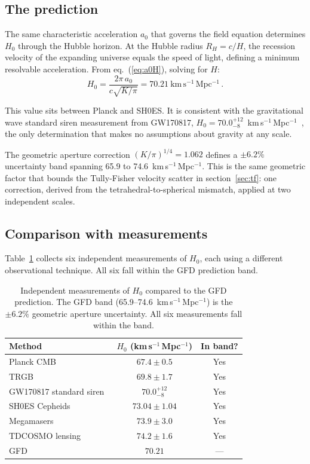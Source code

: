 \documentclass[a4paper,11pt]{article}
\begin{document}
\subsection{The prediction}

The same characteristic acceleration $a_0$ that governs the field equation determines $H_0$ through the Hubble horizon. At the Hubble radius $R_H = c/H$, the recession velocity of the expanding universe equals the speed of light, defining a minimum resolvable acceleration. From eq.~(\ref{eq:a0H}), solving for $H$:
\begin{equation}
H_0 = \frac{2\pi\,a_0}{c\sqrt{K/\pi}} = 70.21~\mathrm{km\,s^{-1}\,Mpc^{-1}}\,.
\label{eq:H0}
\end{equation}

This value sits between Planck and SH0ES. It is consistent with the gravitational wave standard siren measurement from GW170817, $H_0 = 70.0^{+12}_{-8}$~km\,s$^{-1}$\,Mpc$^{-1}$~\cite{abbott2017gw}, the only determination that makes no assumptions about gravity at any scale.

The geometric aperture correction $(K/\pi)^{1/4} = 1.062$ defines a $\pm 6.2\%$ uncertainty band spanning 65.9 to 74.6~km\,s$^{-1}$\,Mpc$^{-1}$. This is the same geometric factor that bounds the Tully-Fisher velocity scatter in section~\ref{sec:tf}: one correction, derived from the tetrahedral-to-spherical mismatch, applied at two independent scales.

\subsection{Comparison with measurements}

Table~\ref{tab:h0} collects six independent measurements of $H_0$, each using a different observational technique. All six fall within the GFD prediction band.

\begin{table}[t]
\centering
\begin{tabular}{@{}lcc@{}}
\toprule
Method & $H_0$ (km\,s$^{-1}$\,Mpc$^{-1}$) & In band? \\
\midrule
Planck CMB~\cite{planck2020} & $67.4 \pm 0.5$ & Yes \\
TRGB~\cite{freedman2021} & $69.8 \pm 1.7$ & Yes \\
GW170817 standard siren~\cite{abbott2017gw} & $70.0^{+12}_{-8}$ & Yes \\
SH0ES Cepheids~\cite{riess2022} & $73.04 \pm 1.04$ & Yes \\
Megamasers~\cite{pesce2020} & $73.9 \pm 3.0$ & Yes \\
TDCOSMO lensing~\cite{wong2020} & $74.2 \pm 1.6$ & Yes \\
\midrule
GFD & $70.21$ & --- \\
\bottomrule
\end{tabular}
\caption{Independent measurements of $H_0$ compared to the GFD prediction. The GFD band (65.9--74.6~km\,s$^{-1}$\,Mpc$^{-1}$) is the $\pm 6.2\%$ geometric aperture uncertainty. All six measurements fall within the band.}
\label{tab:h0}
\end{table}
\end{document}
